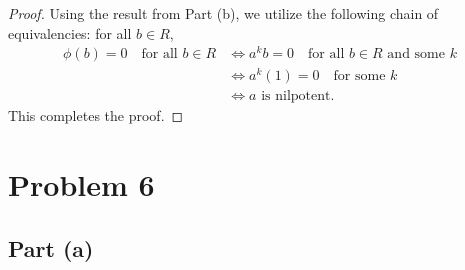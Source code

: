 \documentclass[11pt]{article}
\begin{document}
\begin{proof}
  Using the result from Part (b), we utilize the following chain of equivalencies: for all $b \in R$,
  \begin{align*}
    \phi(b) = 0 \quad \text{for all $b \in R$} & \iff a^{k}b = 0 \quad \text{for all $b \in R$ and some $k$} \\
                      & \iff a^{k}(1) = 0 \quad \text{for some $k$} \\
                      & \iff \text{$a$ is nilpotent}.
  \end{align*}
  This completes the proof.
\end{proof}


\section{Problem 6}


\subsection*{Part (a)}
\end{document}
